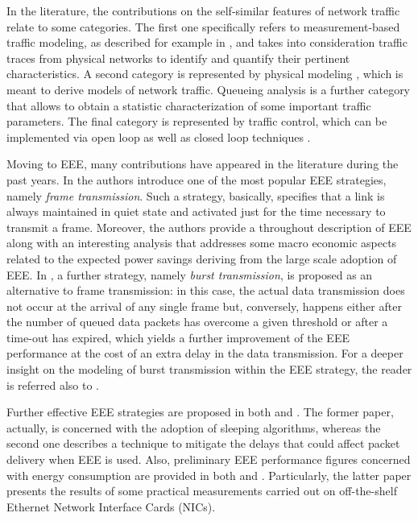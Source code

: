 \documentclass[journal,10pt,twoside,final]{IEEEtran}
\begin{document}
In the literature, the contributions on the self-similar features of network traffic relate to some categories. The first one specifically refers to measurement-based traffic modeling, as described for example in \cite{CrovellaBestavros97}, and takes into  consideration traffic traces from physical networks to identify and quantify their pertinent characteristics. A second category is represented by physical modeling \cite{WillingerTaqquSherman97}, which is meant to derive models of network traffic. Queueing analysis \cite{DuffieldOconnell95} is a further category that allows to obtain a statistic characterization of some important traffic parameters. The final category is represented by traffic control, which can be implemented via open loop as well as closed loop techniques \cite{TuanPark99}.

Moving to EEE, many contributions have appeared in the literature during the past years. In \cite{ChristensenReviriegoNordman10} the authors introduce one of the most popular EEE strategies, namely \emph{frame transmission}. Such a strategy, basically, specifies that a link is always maintained in quiet state and activated just for the time necessary to transmit a frame. Moreover, the authors provide a throughout description of EEE along with an interesting analysis that addresses some macro economic aspects related to the expected power savings deriving from the large scale adoption of EEE. In \cite{ReviriegoMaestroHernandez10}, a further strategy, namely \emph{burst transmission}, is proposed as an alternative to frame transmission: in this case, the actual data transmission does not occur at the arrival of any single frame but, conversely, happens either after the number of queued data packets has overcome a given threshold or after a time-out has expired, which yields a further improvement of the EEE 
performance at the cost of an extra delay in the data transmission. For a deeper insight on the modeling of burst transmission within the EEE strategy, the reader is referred also to \cite{MengRenJiang13}. 

Further effective EEE strategies are proposed in both \cite{HerreriaRodriguezFernandez12} and \cite{reviriego_4}. The former paper, actually, is concerned with the adoption of sleeping algorithms, whereas the second one describes a technique to mitigate the delays that could affect packet delivery when EEE is used. Also, preliminary EEE performance figures concerned with energy consumption are provided in both \cite{ReviriegoHernandezLarrabeiti09} and \cite{ReviriegoChristensenRabanillo11}. Particularly, the latter paper presents the results of some practical measurements carried out on off-the-shelf Ethernet Network Interface Cards (NICs).
\end{document}
